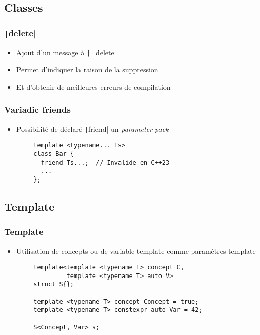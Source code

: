 \documentclass[C++.tex]{subfiles}
\begin{document}
\subsection*{Classes}
\begin{frame}[fragile]
	\frametitle{\texttt|delete|}
	\begin{itemize}
		\item Ajout d'un message à \texttt|=delete|
		\item Permet d'indiquer la raison de la suppression
		\item Et d'obtenir de meilleures erreurs de compilation
	\end{itemize}

\end{frame}

\begin{frame}[fragile]
	\frametitle{Variadic friends}
	\begin{itemize}
		\item Possibilité de déclaré \texttt|friend| un \textit{parameter pack}
	\end{itemize}

	\begin{verbatim}
		template <typename... Ts>
		class Bar {
		  friend Ts...;  // Invalide en C++23
		  ...
		};
	\end{verbatim}

\end{frame}

\subsection*{Template}
\begin{frame}[fragile]
	\frametitle{Template}
	\begin{itemize}
		\item Utilisation de concepts ou de variable template comme paramètres template
	\end{itemize}

	\begin{verbatim}
		template<template <typename T> concept C,
		         template <typename T> auto V>
		struct S{};

		template <typename T> concept Concept = true;
		template <typename T> constexpr auto Var = 42;

		S<Concept, Var> s;
	\end{verbatim}

\end{frame}
\end{document}
